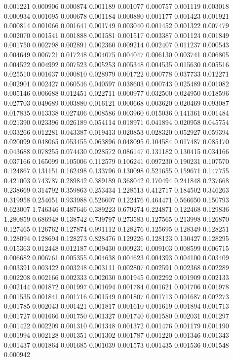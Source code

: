 0.001221
0.000906
0.000874
0.001189
0.001077
0.000757
0.001119
0.003018
0.000934
0.001095
0.000678
0.001184
0.000880
0.001177
0.001423
0.001921
0.000814
0.001066
0.001641
0.001749
0.003040
0.001452
0.001322
0.007479
0.002070
0.001541
0.001888
0.001581
0.001517
0.003387
0.001124
0.001849
0.001750
0.002798
0.002891
0.002360
0.009214
0.002407
0.011237
0.000543
0.004649
0.006721
0.017248
0.004075
0.004047
0.006130
0.003741
0.006805
0.004522
0.004992
0.007523
0.005253
0.005348
0.004535
0.015630
0.005516
0.025510
0.001637
0.000810
0.028979
0.001722
0.000778
0.037733
0.012271
0.002901
0.002427
0.060546
0.040597
0.038603
0.000743
0.025489
0.001082
0.005146
0.006688
0.012451
0.022711
0.000977
0.032500
0.024950
0.018596
0.027703
0.049689
0.003880
0.016121
0.000668
0.003620
0.020469
0.093087
0.017835
0.013338
0.027406
0.008586
0.003960
0.015036
0.141361
0.001484
0.021390
0.023396
0.026189
0.054114
0.018971
0.041894
0.020958
0.045754
0.033266
0.012281
0.043387
0.019413
0.020853
0.028320
0.052927
0.059394
0.020099
0.048065
0.053455
0.063896
0.048095
0.104584
0.017487
0.085170
0.043688
0.078255
0.074430
0.028572
0.086147
0.131182
0.130415
0.034166
0.037166
0.165099
0.105006
0.112579
0.106241
0.097230
0.190231
0.107570
0.124867
0.131151
0.162498
0.133796
0.130098
0.521655
0.159671
0.147755
0.421003
0.743787
0.289842
0.389189
0.368042
0.170494
0.241848
0.237668
0.238669
0.314792
0.359863
0.253434
1.228513
0.412717
0.184502
0.346263
0.319958
0.254651
0.933988
0.526607
0.122476
0.464471
0.566650
0.150793
0.623007
1.746346
0.487646
0.389223
0.679274
0.224871
0.122468
0.129836
1.280859
0.686948
0.138742
0.739797
0.273583
0.127565
0.213998
0.126870
0.127465
0.126762
0.127874
0.991112
0.128276
0.125695
0.128349
0.128251
0.128094
0.128694
0.128273
0.828476
0.129226
0.128123
0.130427
0.128295
0.015363
0.012448
0.012187
0.009430
0.009231
0.009103
0.008599
0.006715
0.006682
0.006761
0.005355
0.004638
0.004623
0.004393
0.004100
0.003409
0.003391
0.003422
0.003248
0.003111
0.002807
0.002591
0.002368
0.002289
0.002208
0.002166
0.002333
0.002030
0.001945
0.002292
0.001909
0.002133
0.002144
0.001872
0.001997
0.001694
0.001784
0.001621
0.001706
0.001978
0.001535
0.001841
0.001716
0.001549
0.001807
0.001713
0.001687
0.002273
0.001785
0.002043
0.001421
0.001817
0.001610
0.001619
0.001894
0.001713
0.001727
0.001666
0.001750
0.001327
0.001740
0.001580
0.002031
0.001297
0.001422
0.002209
0.001310
0.001348
0.001372
0.001476
0.001179
0.001190
0.001994
0.002128
0.001351
0.001302
0.001787
0.001220
0.001346
0.001343
0.001437
0.001864
0.001685
0.001039
0.001573
0.001435
0.001536
0.001548
0.000942
